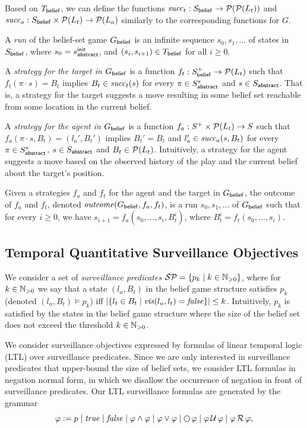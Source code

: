 Based on  $T_{\mathsf{belief}}$, we can define the functions $\mathit{succ}_t : S_{\mathsf{belief}} \to \mathcal{P}(\mathcal{P}(L_t))$ and  $\mathit{succ}_a : S_{\mathsf{belief}} \times \mathcal{P}(L_t) \to \mathcal{P}(L_a)$ similarly to the corresponding functions for $G$. 

A \emph{run} of the belief-set game $G_{\mathsf{belief}}$ is an infinite sequence $s_0,s_1,\ldots$ of states in $S_{\mathsf{belief}}$, where $s_0 = s_{\mathsf{abstract}}^{\mathsf{init}}$, and $(s_i,s_{i+1}) \in T_{\mathsf{belief}}$ for all $i \geq 0$. 

A \emph{strategy for the target in $G_{\mathsf{belief}}$} is a function $f_t: S_{\mathsf{belief}}^+ \to \mathcal{P}(L_t)$ such that $f_t(\pi\cdot s) = B_t$ implies $B_t \in \mathit{succ}_t(s)$ for every $\pi \in S_{\mathsf{abstract}}^*$ and $s \in S_{\mathsf{abstract}}$. That is, a strategy for the target suggests a move resulting in some belief set reachable from some location in the current belief.

A \emph{strategy for the agent in $G_{\mathsf{belief}}$} is a function $f_a : S^+ \times \mathcal{P}(L_t) \to S$ such that $f_a(\pi\cdot s,B_t) = (l_a',B_t')$ implies $B_t' = B_t$ and $l_a' \in \mathit{succ}_a(s,B_t)$ for every $\pi \in S_{\mathsf{abstract}}^*$, $s \in S_{\mathsf{abstract}}$ and $B_t \in \mathcal{P}(L_t)$. Intuitively, a strategy for the agent suggests a move based on the observed history of the play and the current belief about the target's position.

Given a strategies $f_a$ and $f_t$ for the agent and the target in $G_{\mathsf{belief}}$, the outcome of $f_a$ and $f_t$, denoted $\mathit{outcome}(G_{\mathsf{belief}},f_a,f_t)$, is a run $s_0,s_1,\ldots$ of $G_{\mathsf{belief}}$ such that for every $i \geq 0$, we have $s_{i+1} = f_a(s_0,\ldots,s_i,B_t^i)$, where $B_t^i = f_t(s_0,\ldots,s_i)$.

\subsection{Temporal Quantitative Surveillance Objectives}

We consider a set of \emph{surveillance predicates} $\mathcal{SP} = \{p_k \mid k \in \mathbb{N}_{>0}\}$, where for $k \in \mathbb{N}_{>0}$ we say that a state $(l_a,B_t)$ in the belief game structure satisfies $p_k$ (denoted $(l_a,B_t) \models p_k$) iff 
$|\{l_t \in B_t \mid \mathit{vis}(l_a,l_t)  = \mathit{false} \}| \leq k$. Intuitively, $p_k$ is satisfied by the states in the belief game structure where the size of the belief set does not exceed the threshold $k \in \mathbb{N}_{>0}$.

We consider surveillance objectives expressed by formulas of linear temporal logic (LTL) over surveillance predicates. Since we are only interested in surveillance predicates that upper-bound the size of belief sets, we consider LTL formulas in negation normal form, in which we disallow the occurrence of negation in front of surveillance predicates. Our LTL surveillance formulas  are generated by the grammar
\[\varphi := p \mid \true \mid \false \mid \varphi \wedge \varphi \mid \varphi \vee \varphi \mid \LTLnext  \varphi  \mid \varphi \LTLuntil \varphi \mid \varphi \LTLrelease \varphi,\]

